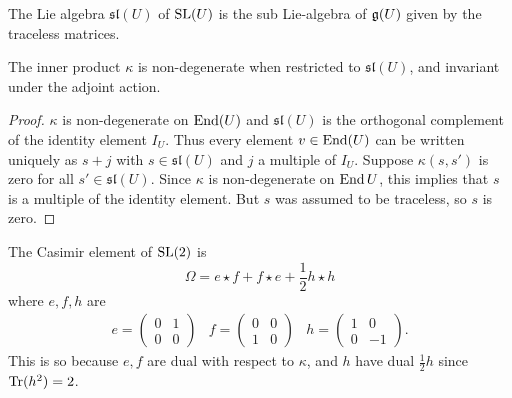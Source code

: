 \documentclass[11pt, english]{article}
\begin{document}
The Lie algebra $\mathfrak{sl}(U)$ of $\operatorname{SL}(U)$ is the sub Lie-algebra of $\mathfrak g(U)$ given by the traceless matrices.

\begin{lemma}
The inner product $\kappa$ is non-degenerate when restricted to $\mathfrak{sl}(U)$, and invariant under the adjoint action.
\end{lemma}
\begin{proof}
$\kappa$ is non-degenerate on $\operatorname{End}(U)$ and $\mathfrak{sl}(U)$ is the orthogonal complement of the identity element $I_U$. Thus every element $v \in \operatorname{End}(U)$ can be written uniquely as $s+j$ with $s \in \mathfrak{sl}(U)$ and $j$ a multiple of $I_U$. Suppose $\kappa(s,s')$ is zero for all $s' \in \mathfrak{sl}(U)$. Since $\kappa$ is non-degenerate on $\operatorname{End} U$, this implies that $s$ is a multiple of the identity element. But $s$ was assumed to be traceless, so $s$ is zero.
\end{proof}

\begin{example}
The Casimir element of $\operatorname{SL}(2)$ is
\[
\Omega = e \star f + f \star e + \frac 12 h \star h
\]
where $e,f,h$ are
\begin{align*}
  e =
  \begin{pmatrix}
    0 & 1 \\ 0 & 0
  \end{pmatrix} &
f = \begin{pmatrix}
0 & 0 \\ 1 & 0
\end{pmatrix} &
h =
\begin{pmatrix}
  1 & 0 \\ 0 & -1
\end{pmatrix}.
\end{align*}
This is so because $e,f$ are dual with respect to $\kappa$, and $h$ have dual $\frac 12 h$ since $\operatorname{Tr}(h^2)=2$.
\end{example}
\end{document}
